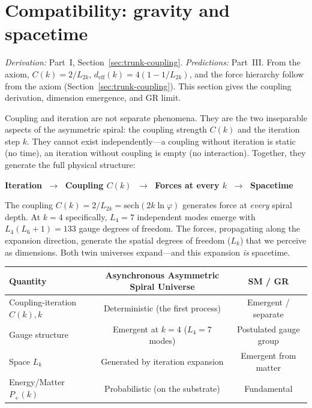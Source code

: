 \documentclass[12pt,a4paper]{article}
\begin{document}


\section{Compatibility: gravity and spacetime}
\label{sec:gravity-spacetime}
\label{sec:coupling-forces}

\noindent\textit{Derivation:} Part~I, Section~\ref{sec:trunk-coupling}. \textit{Predictions:} Part~III. From the axiom, $C(k)=2/L_{2k}$, $d_{\mathrm{eff}}(k)=4(1-1/L_{2k})$, and the force hierarchy follow from the axiom (Section~\ref{sec:trunk-coupling}). This section gives the coupling derivation, dimension emergence, and GR limit.

Coupling and iteration are not separate phenomena. They are the two inseparable aspects of the asymmetric spiral: the coupling strength $C(k)$ and the iteration step $k$. They cannot exist independently---a coupling without iteration is static (no time), an iteration without coupling is empty (no interaction). Together, they generate the full physical structure:

\begin{center}
\textbf{Iteration} $\;\longrightarrow\;$ \textbf{Coupling $C(k)$} $\;\longrightarrow\;$ \textbf{Forces at every $k$} $\;\longrightarrow\;$ \textbf{Spacetime}
\end{center}

The coupling $C(k) = 2/L_{2k} = \mathrm{sech}(2k\ln\varphi)$ generates force at \emph{every} spiral depth. At $k = 4$ specifically, $L_4 = 7$ independent modes emerge with $L_4(L_6+1) = 133$ gauge degrees of freedom. The forces, propagating along the expansion direction, generate the spatial degrees of freedom ($L_k$) that we perceive as dimensions. Both twin universes expand---and this expansion \emph{is} spacetime.

\begin{center}
\begin{tabular}{|l|c|c|}
\hline
\textbf{Quantity} & \textbf{Asynchronous Asymmetric Spiral Universe} & \textbf{SM / GR} \\
\hline
Coupling-iteration $C(k), k$ & Deterministic (the first process) & Emergent / separate \\
Gauge structure & Emergent at $k = 4$ ($L_4 = 7$ modes) & Postulated gauge group \\
Space $L_k$ & Generated by iteration expansion & Emergent from matter \\
Energy/Matter $P_+(k)$ & Probabilistic (on the substrate) & Fundamental \\
\hline
\end{tabular}
\end{center}
\end{document}
